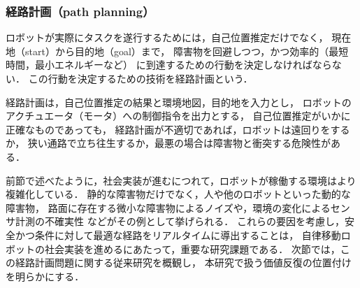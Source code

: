 \subsubsection{経路計画（path planning）}
ロボットが実際にタスクを遂行するためには，自己位置推定だけでなく，
現在地（start）から目的地（goal）まで，
障害物を回避しつつ，かつ効率的（最短時間，最小エネルギーなど）
に到達するための行動を決定しなければならない．
この行動を決定するための技術を経路計画という．

経路計画は，自己位置推定の結果と環境地図，目的地を入力とし，
ロボットのアクチュエータ（モータ）への制御指令を出力とする，
自己位置推定がいかに正確なものであっても，
経路計画が不適切であれば，ロボットは遠回りをするか，
狭い通路で立ち往生するか，最悪の場合は障害物と衝突する危険性がある．


前節で述べたように，社会実装が進むにつれて，ロボットが稼働する環境はより複雑化している．
静的な障害物だけでなく，人や他のロボットといった動的な障害物，
路面に存在する微小な障害物によるノイズや，環境の変化によるセンサ計測の不確実性
などがその例として挙げられる．
これらの要因を考慮し，安全かつ条件に対して最適な経路をリアルタイムに導出することは，
自律移動ロボットの社会実装を進めるにあたって，重要な研究課題である．
次節では，この経路計画問題に関する従来研究を概観し，
本研究で扱う価値反復の位置付けを明らかにする．



